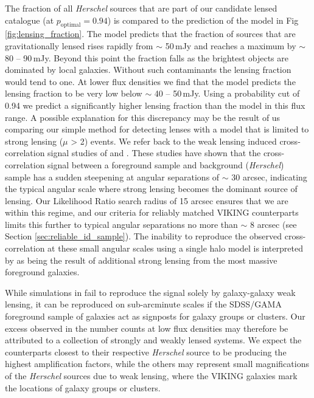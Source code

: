 \documentclass[fleqn,usenatbib]{mnras}
\begin{document}
The fraction of all \textit{Herschel} sources that are part of our candidate lensed catalogue (at $p_{\textrm{optimal}} = 0.94$) is compared to the prediction of the \citealt{Cai_2013} model in Fig \ref{fig:lensing_fraction}. The model predicts that the fraction of sources that are gravitationally lensed rises rapidly from $\sim$ 50\,mJy and reaches a maximum by $\sim$ 80 -- 90\,mJy. Beyond this point the fraction falls as the brightest objects are dominated by local galaxies. Without such contaminants the lensing fraction would tend to one. At lower flux densities we find that the model predicts the lensing fraction to be very low below $\sim$ 40 -- 50\,mJy. Using a probability cut of 0.94 we predict a significantly higher lensing fraction than the model in this flux range. A possible explanation for this discrepancy may be the result of us comparing our simple method for detecting lenses with a model that is limited to strong lensing ($\mu$ > 2) events. We refer back to the weak lensing induced cross-correlation signal studies of \citealt{GonzalezNuevo_2014} and \citealt{GonzalezNuevo_2017}. These studies have shown that the cross-correlation signal between a foreground sample and background (\textit{Herschel}) sample has a sudden steepening at angular separations of $\sim$ 30 arcsec, indicating the typical angular scale where strong lensing becomes the dominant source of lensing. Our Likelihood Ratio search radius of 15 arcsec ensures that we are within this regime, and our criteria for reliably matched VIKING counterparts limits this further to typical angular separations no more than $\sim$ 8 arcsec (see Section \ref{sec:reliable_id_sample}). The inability to reproduce the observed cross-correlation at these small angular scales using a single halo model is interpreted by \citealt{GonzalezNuevo_2017} as being the result of additional strong lensing from the most massive foreground galaxies.

While simulations in \citealt{GonzalezNuevo_2014} fail to reproduce the signal solely by galaxy-galaxy weak lensing, it can be reproduced on sub-arcminute scales if the SDSS/GAMA foreground sample of galaxies act as signposts for galaxy groups or clusters. Our excess observed in the number counts at low flux densities may therefore be attributed to a collection of strongly and weakly lensed systems. We expect the counterparts closest to their respective \textit{Herschel} source to be producing the highest amplification factors, while the others may represent small magnifications of the \textit{Herschel} sources due to weak lensing, where the VIKING galaxies mark the locations of galaxy groups or clusters.
\end{document}
